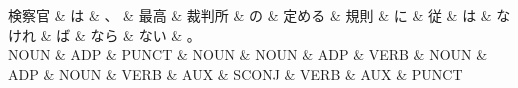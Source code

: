 \documentclass[tikz,border=5pt]{standalone}
\begin{document}
\normalsize
\begin{dependency}[edge unit distance=12.0pt]
    \begin{deptext}[column sep=1em]
        検察官 \& は \& 、 \& 最高 \& 裁判所 \& の \& 定める \& 規則 \& に \& 従 \& は \& なけれ \& ば \& なら \& ない \& 。\\
        NOUN \& ADP \& PUNCT \& NOUN \& NOUN \& ADP \& VERB \& NOUN \& ADP \& NOUN \& VERB \& AUX \& SCONJ \& VERB \& AUX \& PUNCT\\
    \end{deptext}
\end{dependency}
\end{document}
